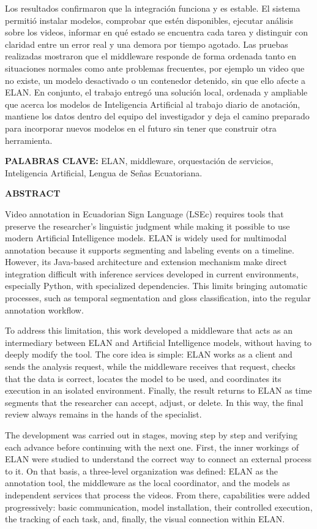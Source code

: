 \documentclass[11pt,a4paper]{article}
\newcommand{\frontsection}[1]{%
    \clearpage
    \phantomsection
    \addcontentsline{toc}{section}{#1}
    {\centering\bfseries\fontsize{16}{19}\selectfont #1\par}
    \vspace{18pt}
}
\begin{document}
Los resultados confirmaron que la integración funciona y es estable. El sistema permitió instalar modelos, comprobar que estén disponibles, ejecutar análisis sobre los videos, informar en qué estado se encuentra cada tarea y distinguir con claridad entre un error real y una demora por tiempo agotado. Las pruebas realizadas mostraron que el middleware responde de forma ordenada tanto en situaciones normales como ante problemas frecuentes, por ejemplo un video que no existe, un modelo desactivado o un contenedor detenido, sin que ello afecte a ELAN. En conjunto, el trabajo entregó una solución local, ordenada y ampliable que acerca los modelos de Inteligencia Artificial al trabajo diario de anotación, mantiene los datos dentro del equipo del investigador y deja el camino preparado para incorporar nuevos modelos en el futuro sin tener que construir otra herramienta.

\textbf{PALABRAS CLAVE:} ELAN, middleware, orquestación de servicios, Inteligencia Artificial, Lengua de Señas Ecuatoriana.

\frontsection{ABSTRACT}
Video annotation in Ecuadorian Sign Language (LSEc) requires tools that preserve the researcher's linguistic judgment while making it possible to use modern Artificial Intelligence models. ELAN is widely used for multimodal annotation because it supports segmenting and labeling events on a timeline. However, its Java-based architecture and extension mechanism make direct integration difficult with inference services developed in current environments, especially Python, with specialized dependencies. This limits bringing automatic processes, such as temporal segmentation and gloss classification, into the regular annotation workflow.

To address this limitation, this work developed a middleware that acts as an intermediary between ELAN and Artificial Intelligence models, without having to deeply modify the tool. The core idea is simple: ELAN works as a client and sends the analysis request, while the middleware receives that request, checks that the data is correct, locates the model to be used, and coordinates its execution in an isolated environment. Finally, the result returns to ELAN as time segments that the researcher can accept, adjust, or delete. In this way, the final review always remains in the hands of the specialist.

The development was carried out in stages, moving step by step and verifying each advance before continuing with the next one. First, the inner workings of ELAN were studied to understand the correct way to connect an external process to it. On that basis, a three-level organization was defined: ELAN as the annotation tool, the middleware as the local coordinator, and the models as independent services that process the videos. From there, capabilities were added progressively: basic communication, model installation, their controlled execution, the tracking of each task, and, finally, the visual connection within ELAN.
\end{document}
